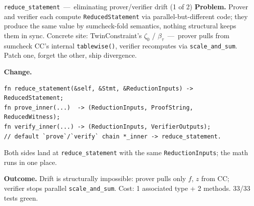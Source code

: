 \documentclass[10pt,aspectratio=169]{beamer}
\begin{document}
\begin{frame}[fragile]{\texttt{reduce\_statement} \,---\, eliminating prover/verifier drift (1 of 2)}
\small
\textbf{Problem.}\;
Prover and verifier each compute \texttt{ReducedStatement} via parallel-but-different code; they produce the same value by sumcheck-fold semantics, nothing structural keeps them in sync. Concrete site: TwinConstraint's $\zeta_0$ / $\beta_\tau$ \,---\, prover pulls from sumcheck CC's internal \texttt{tablewise()}, verifier recomputes via \texttt{scale\_and\_sum}. Patch one, forget the other, ship divergence.

\vspace{0.3em}
\textbf{Change.}
\begin{lstlisting}
fn reduce_statement(&self, &Stmt, &ReductionInputs) -> ReducedStatement;
fn prove_inner(...)  -> (ReductionInputs, ProofString, ReducedWitness);
fn verify_inner(...) -> (ReductionInputs, VerifierOutputs);
// default `prove`/`verify` chain *_inner -> reduce_statement.
\end{lstlisting}
Both sides land at \texttt{reduce\_statement} with the same \texttt{ReductionInputs}; the math runs in one place.

\vspace{0.3em}
\textbf{Outcome.} Drift is structurally impossible: prover pulls only $f$, $z$ from CC; verifier stops parallel \texttt{scale\_and\_sum}. Cost: 1 associated type + 2 methods. 33/33 tests green.
\end{frame}
\end{document}
